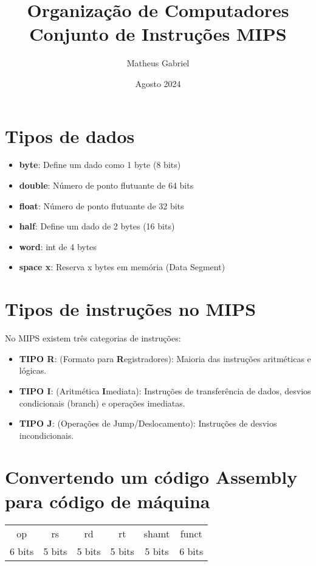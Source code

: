 \documentclass{article}
\title{Organização de Computadores \\
    \large Conjunto de Instruções MIPS}
\author{Matheus Gabriel}
\date{Agosto 2024}
\begin{document}
\maketitle

\section{Tipos de dados}

\begin{itemize}
    \item \textbf{byte}: Define um dado como 1 byte (8 bits)
    \item \textbf{double}: Número de ponto flutuante de 64 bits
    \item \textbf{float}: Número de ponto flutuante de 32 bits
    \item \textbf{half}: Define um dado de 2 bytes (16 bits)
    \item \textbf{word}: int de 4 bytes
    \item \textbf{space x}: Reserva x bytes em memória (Data Segment)
\end{itemize}

\section{Tipos de instruções no MIPS}
No MIPS existem três categorias de instruções: 

\begin{itemize}
    \item \textbf{TIPO R}: (Formato para \textbf{R}egistradores): Maioria das instruções aritméticas e lógicas.
    \item \textbf{TIPO I}: (Aritmética \textbf{I}mediata): Instruções de transferência de dados, desvios condicionais (branch) e operações imediatas.
    \item \textbf{TIPO J}: (Operações de Jump/Deslocamento): Instruções de desvios incondicionais.
\end{itemize}


\section{Convertendo um código Assembly para código de máquina}

\begin{table}[]
    \centering
    \begin{tabular}{|c |c| c| c| c| c|}
        op & rs & rd & rt & shamt & funct \\
        6 bits & 5 bits & 5 bits & 5 bits & 5 bits & 6 bits
    \end{tabular}
\end{table}
\end{document}
